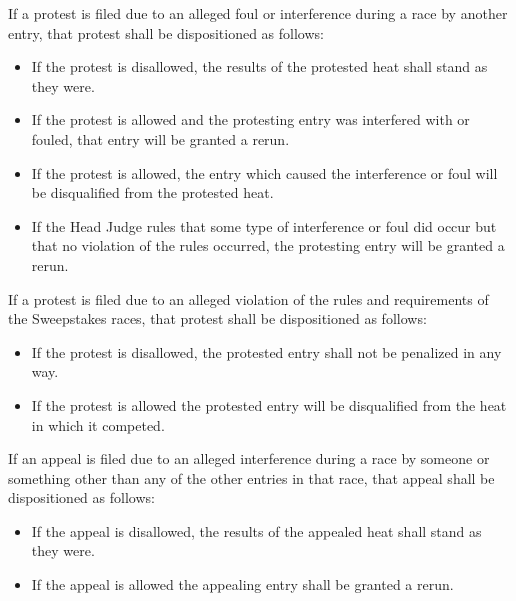 	\noindent If a protest is filed due to an alleged foul or interference during a race by
	another entry, that protest shall be dispositioned as follows:

	\begin{itemize}

		\item
		If the protest is disallowed, the results of the protested heat shall stand as
		they were.

		\item
		If the protest is allowed and the protesting entry was interfered with or
		fouled, that entry will be granted a rerun.

		\item
		If the protest is allowed, the entry which caused the interference or foul will
		be disqualified from the protested heat.

		\item
		If the Head Judge rules that some type of interference or foul did occur but
		that no violation of the rules occurred, the protesting entry will be granted a
		rerun.

	\end{itemize}

	\noindent If a protest is filed due to an alleged violation of the rules and requirements
	of the Sweepstakes races, that protest shall be dispositioned as follows:

	\begin{itemize}

		\item
		If the protest is disallowed, the protested entry shall not be penalized in any
		way.

		\item
		If the protest is allowed the protested entry will be disqualified from the
		heat in which it competed.

	\end{itemize}

	\noindent If an appeal is filed due to an alleged interference during a race by someone
	or something other than any of the other entries in that race, that appeal
	shall be dispositioned as follows:

	\begin{itemize}

		\item
		If the appeal is disallowed, the results of the appealed heat shall stand as
		they were.

		\item
		If the appeal is allowed the appealing entry shall be granted a rerun.

	\end{itemize}	

